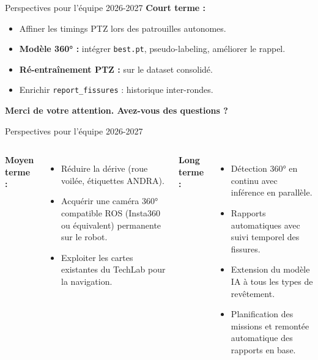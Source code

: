 \documentclass[aspectratio=169]{beamer}
\begin{document}
\begin{frame}{Perspectives pour l'équipe 2026-2027}
    \textbf{\small Court terme :}
    \begin{itemize}\small
        \item Affiner les timings PTZ lors des patrouilles autonomes.
        \item \textbf{Modèle 360° :} intégrer \texttt{best.pt}, pseudo-labeling, améliorer le rappel.
        \item \textbf{Ré-entraînement PTZ :} sur le dataset consolidé.
        \item Enrichir \texttt{report\_fissures} : historique inter-rondes.
    \end{itemize}
    \vspace{0.75cm}
    \centering
    \Large \textbf{Merci de votre attention. Avez-vous des questions ?}
\end{frame}

\begin{frame}{Perspectives pour l'équipe 2026-2027}
    \begin{columns}
        \textbf{\small Moyen terme :}
        \begin{itemize}\small
            \item Réduire la dérive (roue voilée, étiquettes ANDRA).
            \item Acquérir une caméra 360° compatible ROS (Insta360 ou équivalent) permanente sur le robot.
            \item Exploiter les cartes existantes du TechLab pour la navigation.
        \end{itemize}
        \textbf{\small Long terme :}
        \begin{itemize}\small
            \item Détection 360° en continu avec inférence en parallèle.
            \item Rapports automatiques avec suivi temporel des fissures.
            \item Extension du modèle IA à tous les types de revêtement.
            \item Planification des missions et remontée automatique des rapports en base.
        \end{itemize}
    \end{columns}
\end{frame}
\end{document}
